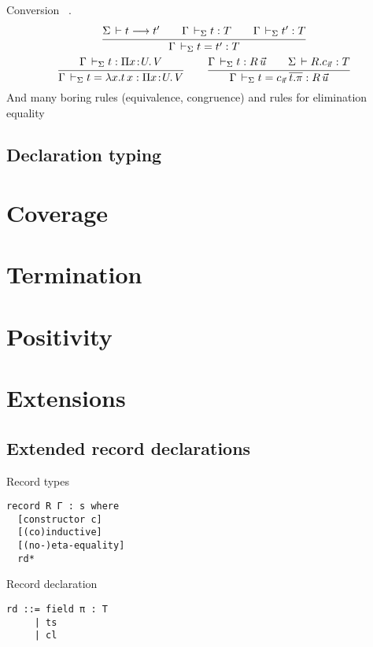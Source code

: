 \documentclass[acmlarge]{acmart}\settopmatter{}
\renewcommand{\|}{\mid}
\begin{document}
Conversion
\ .
\begin{gather*}
%
\ru{\Sigma \der t \red t' \qquad
    \Gamma \ders t : T \qquad
    \Gamma \ders t' : T
  }{\Gamma \ders t = t' : T}
\\
\ru{\Gamma \ders t : \funT x U V
  }{\Gamma \ders t = \lambda x. t\, x : \funT x U V}
\qquad
\ru{\Gamma \ders t : R\, \vec u \qquad
    \Sigma \der R.\cpi : T
  }{\Gamma \ders t = \cpi\,\overline{t .\pi} : R\,\vec u}
\\
\end{gather*}
And many boring rules (equivalence, congruence)
and rules for elimination equality


\subsection{Declaration typing}






\section{Coverage}
\label{sec:coverage}

\section{Termination}
\label{sec:termination}

\section{Positivity}
\label{sec:positivity}

\section{Extensions}
\label{sec:extensions}

\subsection{Extended record declarations}

Record types
\begin{verbatim}
record R Γ : s where
  [constructor c]
  [(co)inductive]
  [(no-)eta-equality]
  rd*
\end{verbatim}

Record declaration
\begin{verbatim}
rd ::= field π : T
     | ts
     | cl
\end{verbatim}
\end{document}
